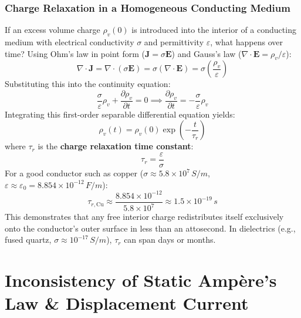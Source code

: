 \subsubsection{Charge Relaxation in a Homogeneous Conducting Medium}
If an excess volume charge $\rho_v(0)$ is introduced into the interior of a conducting medium with electrical conductivity $\sigma$ and permittivity $\varepsilon$, what happens over time? Using Ohm's law in point form ($\mathbf{J} = \sigma \mathbf{E}$) and Gauss's law ($\nabla \cdot \mathbf{E} = \rho_v / \varepsilon$):
\begin{equation}
    \nabla \cdot \mathbf{J} = \nabla \cdot (\sigma \mathbf{E}) = \sigma (\nabla \cdot \mathbf{E}) = \sigma \left( \frac{\rho_v}{\varepsilon} \right)
\end{equation}
Substituting this into the continuity equation:
\begin{equation}
    \frac{\sigma}{\varepsilon} \rho_v + \frac{\partial \rho_v}{\partial t} = 0 \implies \frac{\partial \rho_v}{\partial t} = -\frac{\sigma}{\varepsilon} \rho_v
\end{equation}
Integrating this first-order separable differential equation yields:
\begin{equation}
    \rho_v(t) = \rho_v(0) \exp\left(-\frac{t}{\tau_r}\right)
\end{equation}
where $\tau_r$ is the \textbf{charge relaxation time constant}:
\begin{equation}
    \tau_r = \frac{\varepsilon}{\sigma}
\end{equation}
For a good conductor such as copper ($\sigma \approx 5.8 \times 10^7\,\si{S/m}$, $\varepsilon \approx \varepsilon_0 = 8.854 \times 10^{-12}\,\si{F/m}$):
\begin{equation}
    \tau_{r,\text{Cu}} \approx \frac{8.854 \times 10^{-12}}{5.8 \times 10^7} \approx 1.5 \times 10^{-19}\,\si{s}
\end{equation}
This demonstrates that any free interior charge redistributes itself exclusively onto the conductor's outer surface in less than an attosecond. In dielectrics (e.g., fused quartz, $\sigma \approx 10^{-17}\,\si{S/m}$), $\tau_r$ can span days or months.

\section{Inconsistency of Static Ampère's Law \& Displacement Current}

